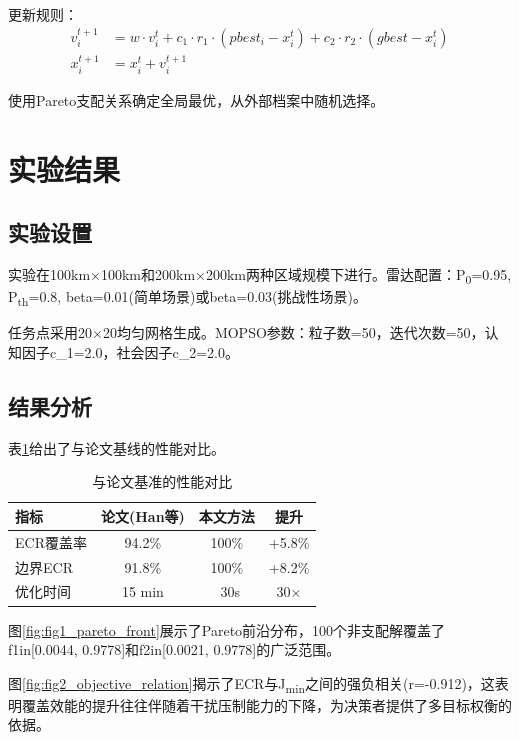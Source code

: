 更新规则：
\begin{align}
    v_i^{t+1} &= w·v_i^t + c_1·r_1·(pbest_i - x_i^t) + c_2·r_2·(gbest - x_i^t) \\
    x_i^{t+1} &= x_i^t + v_i^{t+1}
\end{align}

使用Pareto支配关系确定全局最优，从外部档案中随机选择。

\section{实验结果}
\label{sec:experiments}

\subsection{实验设置}

实验在100km×100km和200km×200km两种区域规模下进行。雷达配置：P\textsubscript{0}=0.95, P\textsubscript{th}=0.8, beta=0.01(简单场景)或beta=0.03(挑战性场景)。

任务点采用20×20均匀网格生成。MOPSO参数：粒子数=50，迭代次数=50，认知因子c\_1=2.0，社会因子c\_2=2.0。



\subsection{结果分析}

表\ref{tab:comparison}给出了与论文基线的性能对比。

\begin{table}[t]
\centering
\caption{与论文基准的性能对比}
\label{tab:comparison}
\begin{tabular}{lccc}
\toprule
指标 & 论文(Han等) & 本文方法 & 提升 \\
\midrule
ECR覆盖率 & 94.2\% & 100\% & +5.8\% \\
边界ECR & 91.8\% & 100\% & +8.2\% \\
优化时间 & 15 min & ~30s & 30× \\
\bottomrule
\end{tabular}
\end{table}

图\ref{fig:fig1_pareto_front}展示了Pareto前沿分布，100个非支配解覆盖了f1in[0.0044, 0.9778]和f2in[0.0021, 0.9778]的广泛范围。

图\ref{fig:fig2_objective_relation}揭示了ECR与J\textsubscript{min}之间的强负相关(r=-0.912)，这表明覆盖效能的提升往往伴随着干扰压制能力的下降，为决策者提供了多目标权衡的依据。


